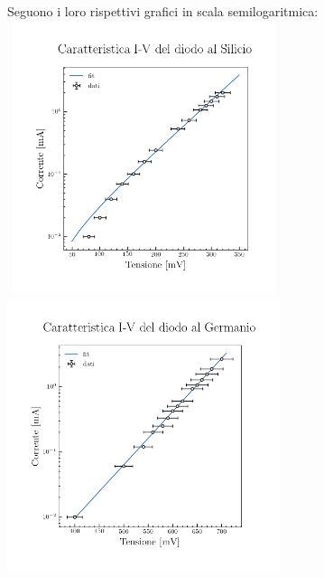 \documentclass{article}
\begin{document}
    Seguono i loro rispettivi grafici in scala semilogaritmica:\\
    \includegraphics[width = 8cm, height = 8cm]{silicio/grafico_silicio.png}
    \hspace{0.5cm}
    \includegraphics[width = 8cm, height = 8cm]{germanio/grafico_germanio.png}
\end{document}
